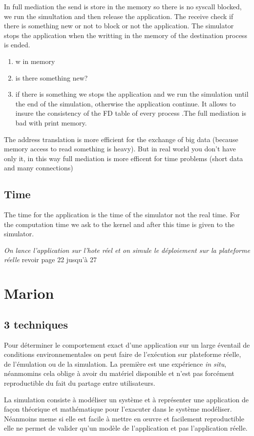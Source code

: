 \documentclass{article}
\begin{document}
In full mediation the send is store in the memory so there is no syscall
blocked, we run the simultation and then release the application. The receive
check if there is something new or not to block or not the application. The
simulator stops the application when the writting in the memory of the
destination process is ended.
\begin{enumerate}
\item w in memory
\item is there something new?
\item if there is something we stops the application and we run the simulation
  until the end of the simulation, otherwise the application continue.  It
  allows to insure the consistency of the FD table of every process .The full
  mediation is bad with print memory.
\end{enumerate}

The address translation is more efficient for the exchange of big data (because
memory access to read something is heavy). But in real world you don't have only
it, in this way full mediation is more efficent for time problems (short data
and many connections)

\subsection{Time}
The time for the application is the time of the simulator not the real time. For
the computation time we ask to the kernel and after this time is given to the
simulator.

\textit{On lance l'application sur l'hote réel et on simule le déploiement sur
  la plateforme réelle} {\color{red} revoir page 22 jusqu'à 27}

\section{Marion}
\subsection{3 techniques}
Pour déterminer le comportement exact d'une application sur un large éventail de
conditions environnementales on peut faire de l'exécution sur plateforme réelle,
de l'émulation ou de la simulation. La première est une expérience \textit{in
  situ}, néanmomins cela oblige à avoir du matériel disponible et n'est pas
forcément reproductible du fait du partage entre utilisateurs.

La simulation consiste à modéliser un système et à représenter une application
de façon théorique et mathématique pour l'exacuter dans le système
modéliser. Néanmoins meme si elle est facile à mettre en \oe uvre et facilement
reproductible elle ne permet de valider qu'un modèle de l'application et pas
l'application réelle.
\end{document}
